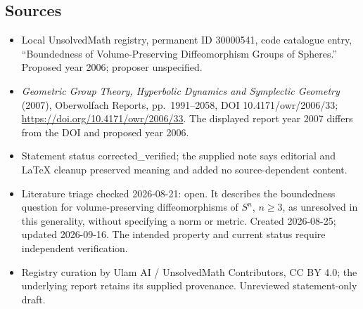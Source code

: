 \documentclass[11pt]{article}
\begin{document}
\subsection{Sources}
\begin{itemize}
\item Local UnsolvedMath registry, permanent ID 30000541, code catalogue entry, ``Boundedness of Volume-Preserving Diffeomorphism Groups of Spheres.'' Proposed year 2006; proposer unspecified.
\item \emph{Geometric Group Theory, Hyperbolic Dynamics and Symplectic Geometry} (2007), Oberwolfach Reports, pp.\ 1991--2058, DOI 10.4171/owr/2006/33; \url{https://doi.org/10.4171/owr/2006/33}. The displayed report year 2007 differs from the DOI and proposed year 2006.
\item Statement status corrected\_verified; the supplied note says editorial and LaTeX cleanup preserved meaning and added no source-dependent content.
\item Literature triage checked 2026-08-21: open. It describes the boundedness question for volume-preserving diffeomorphisms of $S^n$, $n\ge3$, as unresolved in this generality, without specifying a norm or metric. Created 2026-08-25; updated 2026-09-16. The intended property and current status require independent verification.
\item Registry curation by Ulam AI / UnsolvedMath Contributors, CC BY 4.0; the underlying report retains its supplied provenance. Unreviewed statement-only draft.
\end{itemize}
\end{document}

